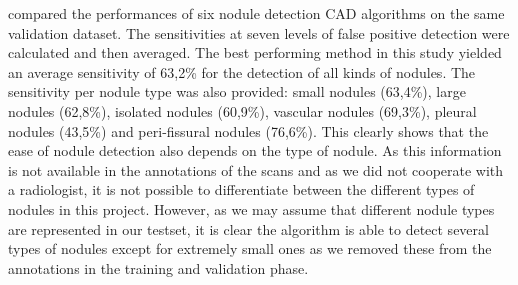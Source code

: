 \cite{ginneken} compared the performances of six nodule detection CAD algorithms
on the same validation dataset. The sensitivities at seven levels of false
positive detection were calculated and then averaged. The best performing method
in this study yielded an average sensitivity of 63,2\% for the detection of all
kinds of nodules. The sensitivity per nodule type was also provided: small
nodules (63,4\%), large nodules (62,8\%), isolated nodules (60,9\%), vascular
nodules (69,3\%), pleural nodules (43,5\%) and peri-fissural nodules (76,6\%).
This clearly shows that the ease of nodule detection also depends on the type of
nodule. As this information is not available in the annotations of the scans and
as we did not cooperate with a radiologist, it is not possible to differentiate
between the different types of nodules in this project. However, as we may
assume that different nodule types are represented in our testset, it is clear
the algorithm is able to detect several types of nodules except for extremely
small ones as we removed these from the annotations in the training and
validation phase.

